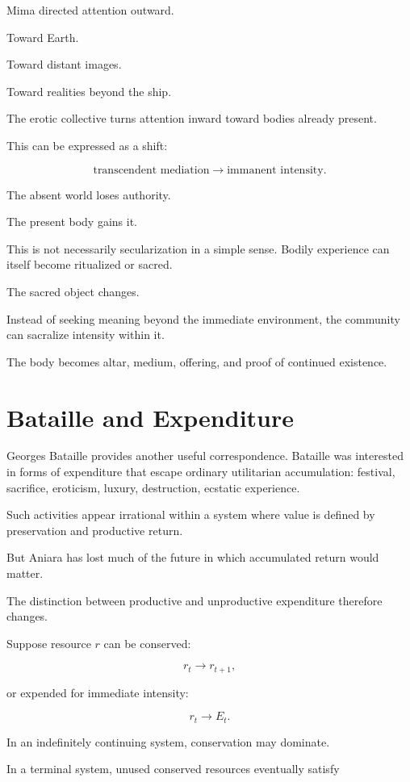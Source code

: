 \documentclass[11pt,oneside]{book}
\theoremstyle{definition}
\theoremstyle{remark}
\begin{document}
Mima directed attention outward.

Toward Earth.

Toward distant images.

Toward realities beyond the ship.

The erotic collective turns attention inward toward bodies already present.

This can be expressed as a shift:

\[
\text{transcendent mediation}
\rightarrow
\text{immanent intensity}.
\]

The absent world loses authority.

The present body gains it.

This is not necessarily secularization in a simple sense. Bodily experience can itself become ritualized or sacred.

The sacred object changes.

Instead of seeking meaning beyond the immediate environment, the community can sacralize intensity within it.

The body becomes altar, medium, offering, and proof of continued existence.

\section{Bataille and Expenditure}

Georges Bataille provides another useful correspondence. Bataille was interested in forms of expenditure that escape ordinary utilitarian accumulation: festival, sacrifice, eroticism, luxury, destruction, ecstatic experience.

Such activities appear irrational within a system where value is defined by preservation and productive return.

But Aniara has lost much of the future in which accumulated return would matter.

The distinction between productive and unproductive expenditure therefore changes.

Suppose resource \(r\) can be conserved:

\[
r_t\rightarrow r_{t+1},
\]

or expended for immediate intensity:

\[
r_t\rightarrow E_t.
\]

In an indefinitely continuing system, conservation may dominate.

In a terminal system, unused conserved resources eventually satisfy
\end{document}

